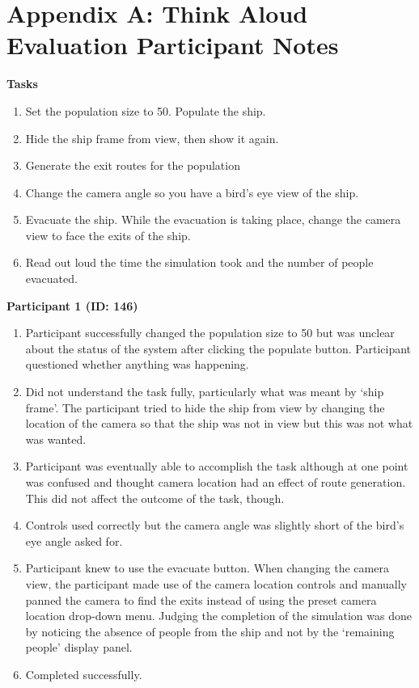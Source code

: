 
\section{Appendix A: Think Aloud Evaluation Participant Notes}
\textbf{Tasks}
\begin{enumerate}
\item Set the population size to 50. Populate the ship.
\item Hide the ship frame from view, then show it again.
\item Generate the exit routes for the population
\item Change the camera angle so you have a bird’s eye view of the ship.
\item Evacuate the ship. While the evacuation is taking place, change the camera view to face the exits of the ship.
\item Read out loud the time the simulation took and the number of people evacuated.
\end{enumerate}

\textbf{Participant 1 (ID: 146)}
\begin{enumerate}
\item Participant successfully changed the population size to 50 but was unclear about the status of the system after clicking the populate button. Participant questioned whether anything was happening.
\item Did not understand the task fully, particularly what was meant by ‘ship frame’. The participant tried to hide the ship from view by changing the location of the camera so that the ship was not in view but this was not what was wanted.
\item Participant was eventually able to accomplish the task although at one point was confused and thought camera location had an effect of route generation. This did not affect the outcome of the task, though.
\item Controls used correctly but the camera angle was slightly short of the bird’s eye angle asked for.
\item Participant knew to use the evacuate button. When changing the camera view, the participant made use of the camera location controls and manually panned the camera to find the exits instead of using the preset camera location drop-down menu. Judging the completion of the simulation was done by noticing the absence of people from the ship and not by the ‘remaining people’ display panel.
\item Completed successfully.
\end{enumerate}

